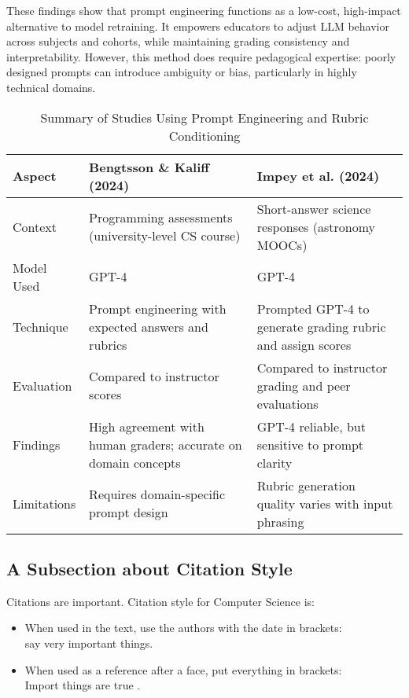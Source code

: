 \documentclass[a4paper,twoside,12pt]{report}
\begin{document}
These findings show that prompt engineering functions as a low-cost, high-impact alternative to model retraining. It empowers educators to adjust LLM behavior across subjects and cohorts, while maintaining grading consistency and interpretability. However, this method does require pedagogical expertise: poorly designed prompts can introduce ambiguity or bias, particularly in highly technical domains.
\begin{table}[H]
  \centering
  \begin{tabular}{|p{3.5cm}|p{6.5cm}|p{6.5cm}|}
  \hline
  \textbf{Aspect} & \textbf{Bengtsson \& Kaliff (2024)} & \textbf{Impey et al. (2024)} \\
  \hline
  Context & Programming assessments (university-level CS course) & Short-answer science responses (astronomy MOOCs) \\
  \hline
  Model Used & GPT-4 & GPT-4 \\
  \hline
  Technique & Prompt engineering with expected answers and rubrics & Prompted GPT-4 to generate grading rubric and assign scores \\
  \hline
  Evaluation & Compared to instructor scores & Compared to instructor grading and peer evaluations \\
  \hline
  Findings & High agreement with human graders; accurate on domain concepts & GPT-4 reliable, but sensitive to prompt clarity \\
  \hline
  Limitations & Requires domain-specific prompt design & Rubric generation quality varies with input phrasing \\
  \hline
  \end{tabular}
  \caption{Summary of Studies Using Prompt Engineering and Rubric Conditioning}
  \label{tab:prompt_rubric_conditioning}
  \end{table}
  
\subsection{A Subsection about Citation Style}
Citations are important. Citation style for Computer Science is:
\begin{itemize}
\item When used in the text, use the authors with the date in brackets:\\ \citet{klein17} say very important things.
\item When used as a reference after a face, put everything in brackets:\\ Import things are true \citep{klein17}.
\end{itemize}
\end{document}
